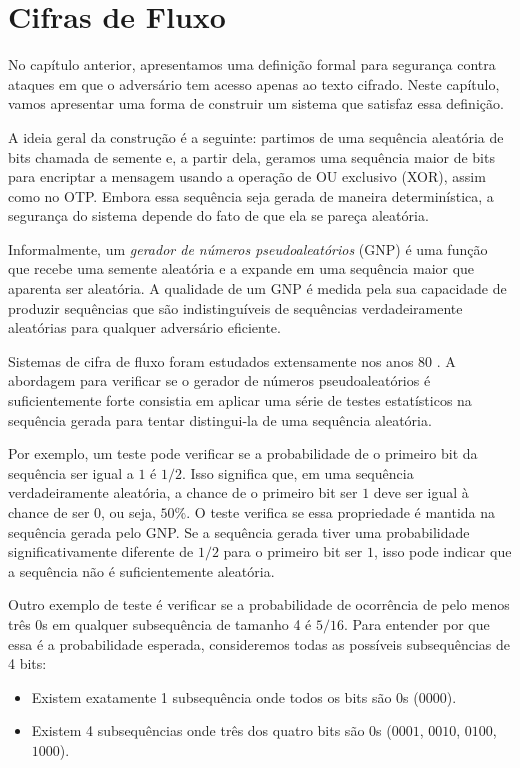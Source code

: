 \chapter{Cifras de Fluxo}
\label{cha:cifras-de-fluxo}

No capítulo anterior, apresentamos uma definição formal para segurança contra ataques em que o adversário tem acesso apenas ao texto cifrado.
Neste capítulo, vamos apresentar uma forma de construir um sistema que satisfaz essa definição.

A ideia geral da construção é a seguinte:
partimos de uma sequência aleatória de bits chamada de semente e, a partir dela, geramos uma sequência maior de bits para encriptar a mensagem usando a operação de OU exclusivo (XOR), assim como no OTP.
Embora essa sequência seja gerada de maneira determinística, a segurança do sistema depende do fato de que ela se pareça aleatória.

Informalmente, um {\em gerador de números pseudoaleatórios} (GNP) é uma função que recebe uma semente aleatória e a expande em uma sequência maior que aparenta ser aleatória.
A qualidade de um GNP é medida pela sua capacidade de produzir sequências que são indistinguíveis de sequências verdadeiramente aleatórias para qualquer adversário eficiente.

Sistemas de cifra de fluxo foram estudados extensamente nos anos 80 \cite{Blum84,Yao82}.
A abordagem para verificar se o gerador de números pseudoaleatórios é suficientemente forte consistia em aplicar uma série de testes estatísticos na sequência gerada para tentar distingui-la de uma sequência aleatória.

Por exemplo, um teste pode verificar se a probabilidade de o primeiro bit da sequência ser igual a $1$ é $1/2$.
Isso significa que, em uma sequência verdadeiramente aleatória, a chance de o primeiro bit ser $1$ deve ser igual à chance de ser $0$, ou seja, $50\%$.
O teste verifica se essa propriedade é mantida na sequência gerada pelo GNP.
Se a sequência gerada tiver uma probabilidade significativamente diferente de $1/2$ para o primeiro bit ser $1$, isso pode indicar que a sequência não é suficientemente aleatória.

Outro exemplo de teste é verificar se a probabilidade de ocorrência de pelo menos três $0$s em qualquer subsequência de tamanho 4 é $5/16$.
Para entender por que essa é a probabilidade esperada, consideremos todas as possíveis subsequências de 4 bits:

\begin{itemize}
\item Existem exatamente 1 subsequência onde todos os bits são $0$s ($0000$).
\item Existem 4 subsequências onde três dos quatro bits são $0$s ($0001$, $0010$, $0100$, $1000$).
\end{itemize}

